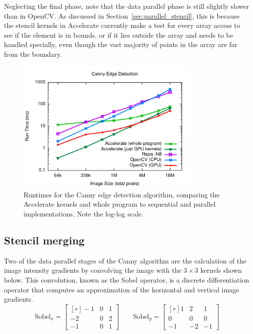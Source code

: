 Neglecting the final phase, note that the data parallel phase is still slightly
slower than in OpenCV. As discussed in
Section~\ref{sec:parallel_stencil}, this is because the stencil kernels
in Accelerate currently make a test for every array access to see if the element
is in bounds, or if it lies outside the array and needs to be handled specially,
even though the vast majority of points in the array are far from the boundary.

\begin{figure}
    \begin{center}
        \includegraphics[width=0.8\textwidth]{images/sec-6/canny/canny}
    \end{center}
    \caption[Canny edge detection benchmarks]{Runtimes for the Canny edge
        detection algorithm, comparing the Accelerate kernels and whole program
        to sequential and parallel implementations. Note the log-log scale.}
    \label{fig:canny}
\end{figure}


\subsection{Stencil merging}

Two of the data parallel stages of the Canny algorithm are the calculation of
the image intensity gradients by convolving the image with the $3\times3$
kernels shown below. This convolution, known as the Sobel operator, is a
discrete differentiation operator that computes an approximation of the
horizontal and vertical image gradients.
%
\begin{equation*}
    \text{Sobel}_x =
        \begin{bmatrix*}[r]
          -1 & 0 & 1 \\
          -2 & 0 & 2 \\
          -1 & 0 & 1
        \end{bmatrix*}
    \qquad
    \text{Sobel}_y =
        \begin{bmatrix*}[r]
           1 &  2 &  1 \\
           0 &  0 &  0 \\
          -1 & -2 & -1
        \end{bmatrix*}
\end{equation*}

